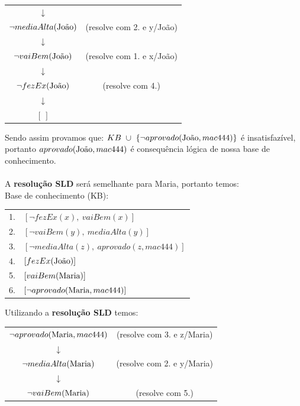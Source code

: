 \documentclass[12pt]{article}
\begin{document}
\begin{itemize}
\begin{center}
\begin{tabular}{c c}
					$\downarrow$ & \\
					$\neg mediaAlta(\textnormal{João})$ & (resolve com 2. e y/João)\\
					$\downarrow$ & \\
					$\neg vaiBem(\textnormal{João})$ & (resolve com 1. e x/João)\\
					$\downarrow$ & \\
					$\neg fezEx(\textnormal{João})$ & (resolve com 4.)\\
					$\downarrow$ & \\
					$[ \ ]$ & \\
				\end{tabular}
			\end{center}
			Sendo assim provamos que: $KB \ \cup \  \{ \neg aprovado(\textnormal{João}, 
			mac444) \}$ é insatisfazível, portanto $aprovado(\textnormal{João}, mac444)$  
			é consequência lógica de nossa base de conhecimento.\\ \\
			A \textbf{resolução SLD} será semelhante para Maria, portanto temos:\\
			Base de conhecimento (KB):\\
			\begin{center}
				\begin{tabular}{c l}
				1. & $[\neg fezEx(x), \ vaiBem(x)]$\\
				2. & $[\neg vaiBem(y), \ mediaAlta(y)]$\\
				3. & $[\neg mediaAlta(z), \ aprovado(z, mac444)] $\\
				4. & $[fezEx(\textnormal{João})]$\\
				5. & $[vaiBem(\textnormal{Maria})]$\\
				6. & $[\neg aprovado(\textnormal{Maria}, mac444)]$\\
				\end{tabular}
			\end{center}
			Utilizando a \textbf{resolução SLD} temos:\\
			\begin{center}
				\begin{tabular}{c c}
					$\neg aprovado(\textnormal{Maria}, mac444)$ & (resolve com 3. e z/Maria)\\
					$\downarrow$ & \\
					$\neg mediaAlta(\textnormal{Maria})$ & (resolve com 2. e y/Maria)\\
					$\downarrow$ & \\
					$\neg vaiBem(\textnormal{Maria})$ & (resolve com 5.)\\

\end{tabular}
\end{center}
\end{itemize}
\end{document}
